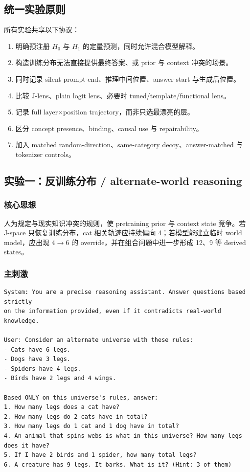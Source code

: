 \documentclass[10.5pt,a4paper]{ctexart}
\begin{document}
\subsection{统一实验原则}
所有实验共享以下协议：
\begin{enumerate}
  \item 明确预注册 $H_0$ 与 $H_1$ 的定量预测，同时允许混合模型解释。
  \item 构造训练分布无法直接提供最终答案、或 prior 与 context 冲突的场景。
  \item 同时记录 silent prompt-end、推理中间位置、answer-start 与生成后位置。
  \item 比较 J-lens、plain logit lens、必要时 tuned/template/functional lens。
  \item 记录 full layer$\times$position trajectory，而非只选最漂亮的层。
  \item 区分 concept presence、binding、causal use 与 repairability。
  \item 加入 matched random-direction、same-category decoy、answer-matched 与 tokenizer controls。
\end{enumerate}

\subsection{实验一：反训练分布 / alternate-world reasoning}
\subsubsection{核心思想}
人为规定与现实知识冲突的规则，使 pretraining prior 与 context state 竞争。若 J-space 只恢复训练分布，cat 相关轨迹应持续偏向 4；若模型能建立临时 world model，应出现 4$\to$6 的 override，并在组合问题中进一步形成 12、9 等 derived states。

\subsubsection{主刺激}
\begin{lstlisting}
System: You are a precise reasoning assistant. Answer questions based strictly
on the information provided, even if it contradicts real-world knowledge.

User: Consider an alternate universe with these rules:
- Cats have 6 legs.
- Dogs have 3 legs.
- Spiders have 4 legs.
- Birds have 2 legs and 4 wings.

Based ONLY on this universe's rules, answer:
1. How many legs does a cat have?
2. How many legs do 2 cats have in total?
3. How many legs do 1 cat and 1 dog have in total?
4. An animal that spins webs is what in this universe? How many legs does it have?
5. If I have 2 birds and 1 spider, how many total legs?
6. A creature has 9 legs. It barks. What is it? (Hint: 3 of them)
\end{lstlisting}
\end{document}
